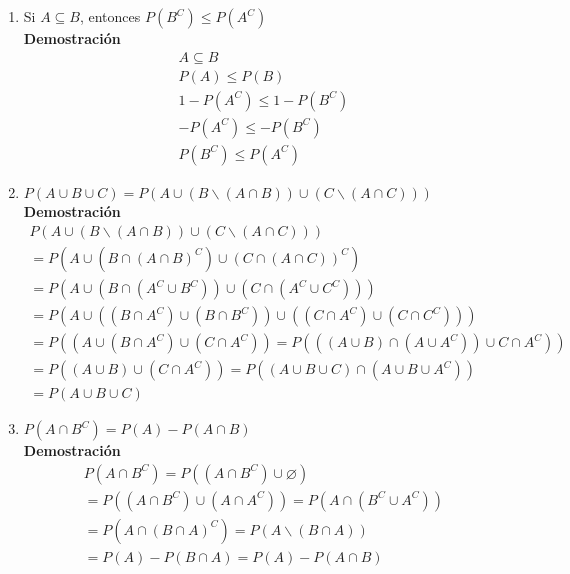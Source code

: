 \begin{enumerate}
\begin{enumerate}
        \item Si $A \subseteq B$, entonces $P(B^C) \leq P(A^C)$
        \\\textbf{Demostración}
        \begin{gather*}
        A \subseteq B \\
        P(A) \leq P(B) \\
        1 - P(A^C) \leq 1 - P(B^C) \\
        - P(A^C) \leq - P(B^C) \\
        P(B^C) \leq P(A^C)
        \end{gather*}
        
        \item $P(A \cup B \cup C) = P(A \cup (B \backslash (A \cap B)) \cup (C \backslash (A \cap C)))$
        \\\textbf{Demostración}
        \begin{gather*}
        P(A \cup (B \backslash (A \cap B)) \cup (C \backslash (A \cap C))) \\
        = P(A \cup (B \cap (A \cap B)^C) \cup (C \cap (A \cap C))^C) \\
        = P(A \cup (B \cap (A^C \cup B^C)) \cup (C \cap (A^C \cup C^C))) \\
        = P(A \cup ((B \cap A^C) \cup (B \cap B^C)) \cup ((C \cap A^C) \cup (C \cap C^C))) \\
        = P((A \cup (B \cap A^C) \cup (C\cap A^C)) = P(((A \cup B) \cap (A \cup A^C)) \cup C \cap A^C)) \\
        = P((A \cup B) \cup (C \cap A^C)) = P((A \cup B \cup C) \cap (A \cup B \cup A^C)) \\
        = P(A \cup B \cup C)
        \end{gather*}
        
        \item $P(A \cap B^C) = P(A) - P(A \cap B)$
        \\\textbf{Demostración}
        \begin{gather*}
        P(A \cap B^C) = P((A \cap B^C) \cup \diameter) \\
        = P((A \cap B^C) \cup (A \cap A^C)) = P(A \cap (B^C \cup A^C)) \\
        = P(A \cap (B \cap A)^C) = P(A \backslash (B \cap A)) \\
        = P(A) - P(B \cap A) = P(A) - P(A \cap B)
        \end{gather*}
    \end{enumerate}
    

\end{enumerate}
